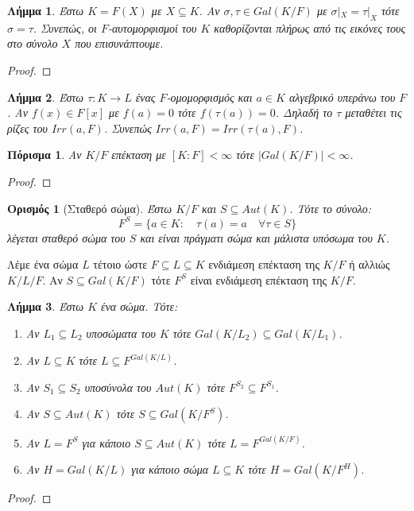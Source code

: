 \documentclass[oneside,a4paper]{article}
\newtheorem{lemma}{Λήμμα}
\newtheorem*{defn}{Ορισμός}
\newtheorem{cor}{Πόρισμα}
\begin{document}
\begin{lemma}
	Έστω $K=F(X)$ με $X \subseteq K$. Αν $\sigma , \tau \in Gal(K/F)$ με $\sigma|_X = \tau|_X $ τότε $\sigma = \tau$. Συνεπώς, οι $F$-αυτομορφισμοί του $K$ καθορίζονται πλήρως από τις εικόνες τους στο σύνολο $X$ που επισυνάπτουμε.
\end{lemma}

\begin{proof}
\end{proof}



\begin{lemma}
	Έστω $\tau : K \rightarrow L$ ένας $F$-ομομορφισμός και $a \in K$ αλγεβρικό υπεράνω του $F$. Αν $f(x) \in F[x]$ με $f(a)=0$ τότε $f(\tau(a)) = 0$. Δηλαδή το $\tau$ μεταθέτει τις ρίζες του $Irr(a,F)$. Συνεπώς $Irr(a,F) = Irr(\tau(a),F)$.
\end{lemma}

\begin{cor}
	Αν $K/F$ επέκταση με $[K:F]<\infty$ τότε $|Gal(K/F)| <\infty$.
\end{cor}
\begin{proof}
\end{proof}

\begin{defn}[Σταθερό σώμα]
	Έστω $K/F$ και $S \subseteq Aut(K)$. Τότε το σύνολο:
	$$F^S = \{a \in K: \quad \tau(a) = a \quad\forall \tau \in S\}$$
	λέγεται σταθερό σώμα του $S$ και είναι πράγματι σώμα και μάλιστα υπόσωμα του $K$.
\end{defn}

Λέμε ένα σώμα $L$ τέτοιο ώστε $F \subseteq L \subseteq K$ ενδιάμεση επέκταση της $K/F$ ή αλλιώς $K/L/F$. Αν $S\subseteq Gal(K/F)$ τότε $F^S$ είναι ενδιάμεση επέκταση της $K/F$.

\begin{lemma}
	Έστω $K$ ένα σώμα. Τότε:
	\begin{enumerate}
		\item Αν $L_1 \subseteq L_2$ υποσώματα του $K$ τότε $Gal(K/L_2) \subseteq Gal(K/L_1)$.
		\item Αν $L\subseteq K$ τότε $L \subseteq F^{Gal(K/L)}$.
		\item Αν $S_1 \subseteq S_2$ υποσύνολα του $Aut(K)$ τότε $F^{S_2} \subseteq F^{S_1}$.
		\item Αν $S \subseteq Aut(K)$ τότε $S\subseteq Gal(K/F^S)$.
		\item Αν $L = F^S$ για κάποιο $S\subseteq Aut(K)$ τότε $L = F^{Gal(K/F)}$.
		\item Αν $H = Gal(K/L)$ για κάποιο σώμα $L \subseteq K$ τότε $H = Gal(K/F^H)$.
	\end{enumerate}
\end{lemma}
\begin{proof}
\end{proof}
\end{document}
